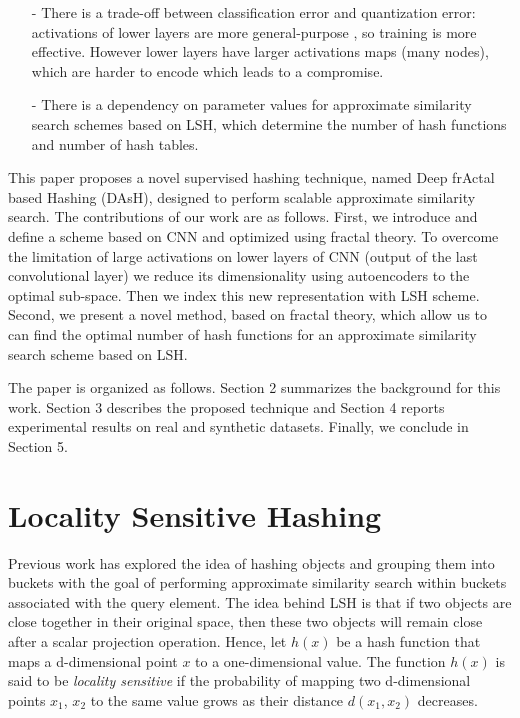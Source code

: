 \documentclass{article}
\begin{document}
\begin{itemize}


 
\item[-]  There is a trade-off between classification error and quantization error: activations of lower layers are more general-purpose \cite{DBLP:journals/corr/YosinskiCBL14}, so training is more effective. However lower layers have larger  activations maps (many nodes), which are harder to encode which leads to a compromise.

 
\item[-]  There is a dependency on parameter values  for approximate similarity search schemes based on LSH, which determine the number of hash functions and number of hash tables.

\end{itemize}


 
 This paper proposes a novel supervised hashing technique,  named  Deep frActal based  Hashing (DAsH),  designed to perform scalable approximate similarity search. The contributions of our work are as follows. First,  we introduce and define a  scheme based on CNN and optimized using fractal theory. To overcome the limitation of large activations on lower layers of CNN (output of the last convolutional layer) we reduce its dimensionality using autoencoders  to the optimal sub-space. Then we index this new representation with LSH scheme.  Second, we present a novel method, based on fractal theory, which allow us to can find the optimal number of hash functions for an approximate similarity search scheme based on LSH.

 
The paper is organized as follows. Section 2 summarizes the background for this work. Section 3 describes the proposed technique and Section 4 reports experimental results on real and synthetic datasets. Finally, we conclude in Section 5.
 

 
\section{Locality Sensitive Hashing}\label{sec:background}

Previous work \cite{hashing_algoritghms_survey} has explored the idea of hashing objects and grouping them into buckets with the goal of performing approximate similarity search within buckets associated with the query element.  The idea behind LSH is that if two objects are close together in their original space, then these two objects will remain close after a scalar projection operation. Hence, let $h(x)$ be a hash function that maps a d-dimensional point $x$ to a one-dimensional value. The function $h(x)$ is said to be \textit{locality sensitive} if the probability of mapping two d-dimensional points $x_1$, $x_2$ to the same value grows as their distance $d(x_1, x_2)$ decreases. 
\end{document}

